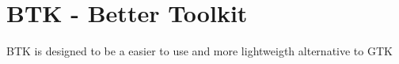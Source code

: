 \chapter{BTK -\/ Better Toolkit}
\hypertarget{md_README}{}\label{md_README}
\label{md_README_autotoc_md0}%
%


BTK is designed to be a easier to use and more lightweigth alternative to GTK 